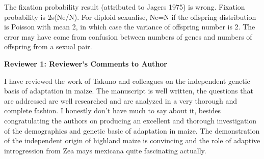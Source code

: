 \documentclass[onecolumn,oneside,letterpaper]{article}
\begin{document}
The fixation probability result (attributed to Jagers 1975) is wrong.  Fixation probability is 2s(Ne/N).  For diploid sexualise, Ne=N if the offspring distribution is Poisson with mean 2, in which case the variance of offspring number is 2.  The error may have come from confusion between numbers of genes and numbers of offspring from a sexual pair.

\textbf{Reviewer 1: Reviewer's Comments to Author}

I have reviewed the work of Takuno and colleagues on the independent genetic basis of adaptation in maize. The manuscript is well written, the questions that are addressed are well researched and are analyzed in a very thorough and complete fashion. I honestly don't have much to say about it, besides congratulating the authors on producing an excellent and thorough investigation of the demographics and genetic basic of adaptation in maize. The demonstration of the independent origin of highland maize is convincing and the role of adaptive introgression from Zea mays mexicana quite fascinating actually.  
\end{document}
